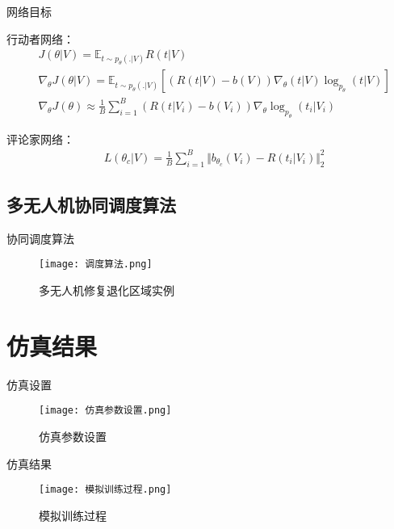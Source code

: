 \documentclass{ctexbeamer}
\begin{document}
\begin{frame}{网络目标}

行动者网络：
\begin{align}
    &J(\theta|V) = \mathbb{E}_{t\sim p_\theta(.|V)}R(t|V)\\
    &\nabla_ \theta J(\theta|V)=\mathbb{E}_{t\sim p_\theta(.|V)}[(R(t|V)-b(V))\nabla_\theta(t|V)\log_{p_\theta}(t|V)]\\
    &\nabla_ \theta J(\theta)\approx \frac{1}{B}\sum \limits_{i=1}^B(R(t|V_i)-b(V_i))\nabla_ \theta \log_{p_\theta }(t_i|V_i)
\end{align}

评论家网络：
\begin{align}
    &L(\theta_c|V)=\frac{1}{B}\sum \limits_{i=1}^B \Vert b_\theta_c(V_i)-R(t_i|V_i)\Vert_2^2
\end{align}
\end{frame}
\subsection{多无人机协同调度算法}
\begin{frame}{协同调度算法}
    \begin{figure}[!h]
        \centering
        \texttt{[image: 调度算法.png]}
        \caption{多无人机修复退化区域实例}
        \label{fig:my_label}
    \end{figure}
\end{frame}

\section{仿真结果}
\begin{frame}{仿真设置}
    \begin{figure}[!h]
        \centering
        \texttt{[image: 仿真参数设置.png]}
        \caption{仿真参数设置}
        \label{fig:my_label}
    \end{figure}
\end{frame}
\begin{frame}{仿真结果}
    \begin{figure}[!h]
        \centering
        \texttt{[image: 模拟训练过程.png]}
        \caption{模拟训练过程}
        \label{fig:my_label}
    \end{figure}
\end{frame}
\end{document}
